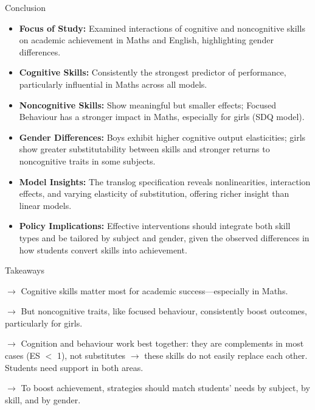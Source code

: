 \documentclass{beamer}
\begin{document}
\begin{frame}{Conclusion}
\small
\begin{itemize}
    \item \textbf{Focus of Study:} Examined interactions of cognitive and noncognitive skills on academic achievement in Maths and English, highlighting gender differences.
    
    \item \textbf{Cognitive Skills:} Consistently the strongest predictor of performance, particularly influential in Maths across all models.
    
    \item \textbf{Noncognitive Skills:} Show meaningful but smaller effects; Focused Behaviour has a stronger impact in Maths, especially for girls (SDQ model).
    
    \item \textbf{Gender Differences:} Boys exhibit higher cognitive output elasticities; girls show greater substitutability between skills and stronger returns to noncognitive traits in some subjects.
    
    \item \textbf{Model Insights:} The translog specification reveals nonlinearities, interaction effects, and varying elasticity of substitution, offering richer insight than linear models.
    
    \item \textbf{Policy Implications:} Effective interventions should integrate both skill types and be tailored by subject and gender, given the observed differences in how students convert skills into achievement.
\end{itemize}
\end{frame}

\begin{frame}{Takeaways}

$\rightarrow$ Cognitive skills matter most for academic success—especially in Maths.

$\rightarrow$ But noncognitive traits, like focused behaviour, consistently boost outcomes, particularly for girls.

$\rightarrow$ Cognition and behaviour work best together: they are complements in most cases (ES $<$ 1), not substitutes $\rightarrow$ these skills do not easily replace each other. Students need support in both areas.

$\rightarrow$ To boost achievement, strategies should match students’ needs by subject, by skill, and by gender.
\end{frame}
\end{document}
